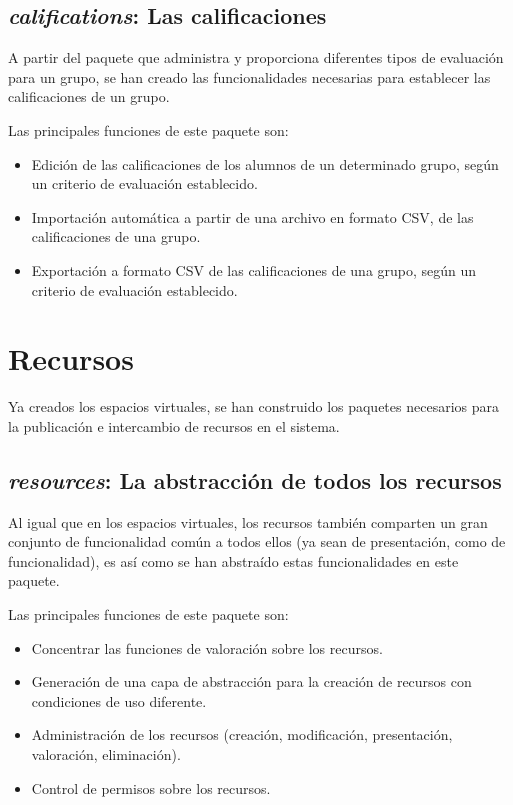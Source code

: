 \subsection{\emph{califications}: Las calificaciones}
A partir del paquete que administra y proporciona diferentes tipos de evaluación
para un grupo, se han creado las funcionalidades necesarias para establecer las
calificaciones de un grupo.

Las principales funciones de este paquete son:

\begin{itemize}
\item Edición de las calificaciones de los alumnos de un determinado grupo,
según un criterio de evaluación establecido.
\item Importación automática a partir de una archivo en formato CSV, de las
calificaciones de una grupo.
\item Exportación a formato CSV de las calificaciones de una grupo, según un
criterio de evaluación establecido.
\end{itemize}

\section{Recursos}
Ya creados los espacios virtuales, se han construido los paquetes necesarios
para la publicación e intercambio de recursos en el sistema.

\subsection{\emph{resources}: La abstracción de todos los recursos}
Al igual que en los espacios virtuales, los recursos también comparten un gran
conjunto de funcionalidad común a todos ellos (ya sean de presentación, como de
funcionalidad), es así como se han abstraído estas funcionalidades en este
paquete.

Las principales funciones de este paquete son:

\begin{itemize}
\item Concentrar las funciones de valoración sobre los recursos.
\item Generación de una capa de abstracción para la creación de recursos con
condiciones de uso diferente.
\item Administración de los recursos (creación, modificación, presentación,
valoración, eliminación).
\item Control de permisos sobre los recursos.
\end{itemize}

